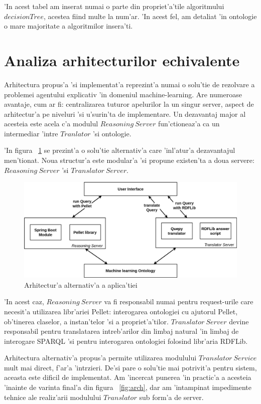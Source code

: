 \documentclass[12pt,a4paper,twoside]{report}
\begin{document}
'In acest tabel am inserat numai o parte din propriet'a'tile algoritmului $decisionTree$, acestea fiind multe la num'ar. 'In acest fel, am detaliat 'in ontologie o mare majoritate a algoritmilor insera'ti. 


\section{Analiza arhitecturilor echivalente}

Arhitectura propus'a 'si implementat'a reprezint'a numai o solu'tie de rezolvare a problemei agentului explicativ 'in domeniul machine-learning. Are numeroase avantaje, cum ar fi: centralizarea tuturor apelurilor la un singur server, aspect de arhitectur'a pe niveluri 'si u'surin'ta de implementare. Un dezavantaj major al acesteia este acela c'a modulul $Reasoning\ Server$ fun'ctioneaz'a ca un intermediar 'intre $Tranlator$ 'si ontologie. 

'In figura ~\ref{fig:alternative_arh} se prezint'a o solu'tie alternativ'a care 'inl'atur'a dezavantajul men'tionat. Noua structur'a este modular'a 'si propune existen'ta a doua servere: $Reasoning\ Server$ 'si $Translator\ Server$.


\begin{figure}
    \centering
    \includegraphics[width = 0.85 \linewidth]{img/arhitectura_alternativa.png}
        \caption{Arhitectur'a alternativ'a a aplica'tiei}
    \label{fig:alternative_arh}
\end{figure}

'In acest caz, $Reasoning\ Server$ va fi responsabil numai pentru request-urile care necesit'a utilizarea libr'ariei Pellet: interogarea ontologiei cu ajutorul Pellet, ob'tinerea claselor, a instan'telor 'si a propriet'a'tilor. $Translator\ Server$ devine responsabil pentru translatarea intreb'arilor din limbaj natural 'in limbaj de interogare SPARQL 'si pentru interogarea ontologiei folosind libr'aria RDFLib.

Arhitectura alternativ'a propus'a permite utilizarea modulului $Translator\ Service$ mult mai direct, f'ar'a 'int\ia rzieri. De'si pare o solu'tie mai potrivit'a pentru sistem, aceasta este dificil de implementat. Am 'incercat punerea 'in practic'a a acesteia 'inainte de varinta final'a din figura ~\ref{fig:arch}, dar am 'intampinat impedimente tehnice ale realiz'arii modulului $Translator$ sub form'a de server.
\end{document}
